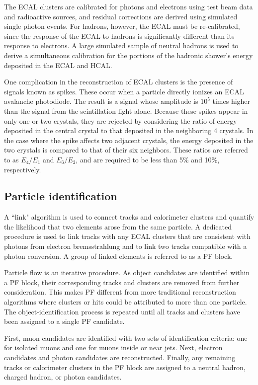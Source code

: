 The ECAL clusters are calibrated for photons and electrons using test beam data and radioactive sources, and residual corrections are derived using simulated single photon events. For hadrons, however, the ECAL must be re-calibrated, since the response of the ECAL to hadrons is significantly different than its response to electrons. A large simulated sample of neutral hadrons is used to derive a simultaneous calibration for the portions of the hadronic shower's energy deposited in the ECAL and HCAL. 

One complication in the reconstruction of ECAL clusters is the presence of signals known as spikes. These occur when a particle directly ionizes an ECAL avalanche photodiode. The result is a signal whose amplitude is $10^5$ times higher than the signal from the scintillation light alone. Because these spikes appear in only one or two crystals, they are rejected by considering the ratio of energy deposited in the central crystal to that deposited in the neighboring 4 crystals. In the case where the spike affects two adjacent crystals, the energy deposited in the two crystals is compared to that of their six neighbors. These ratios are referred to as $E_4/E_1$ and $E_6/E_2$, and are required to be less than 5\% and 10\%, respectively. 

\subsection{Particle identification}
\label{sec:partID}
A ``link" algorithm is used to connect tracks and calorimeter clusters and quantify the likelihood that two elements arose from the same particle. A dedicated procedure is used to link tracks with any ECAL clusters that are consistent with photons from electron bremsstrahlung  and to link two tracks compatible with a photon conversion. A group of linked elements is referred to as a PF block. 

Particle flow is an iterative procedure. As object candidates are identified within a PF block, their corresponding tracks and clusters are removed from further consideration. This makes PF different from more traditional reconstruction algorithms where clusters or hits could be attributed to more than one particle. The object-identification process is repeated until all tracks and clusters have been assigned to a single PF candidate. 

First, muon candidates are identified with two sets of identification criteria: one for isolated muons and one for muons inside or near jets. Next, electron candidates and photon candidates are reconstructed. Finally, any remaining tracks or calorimeter clusters in the PF block are assigned to a neutral hadron, charged hadron, or photon candidates.

